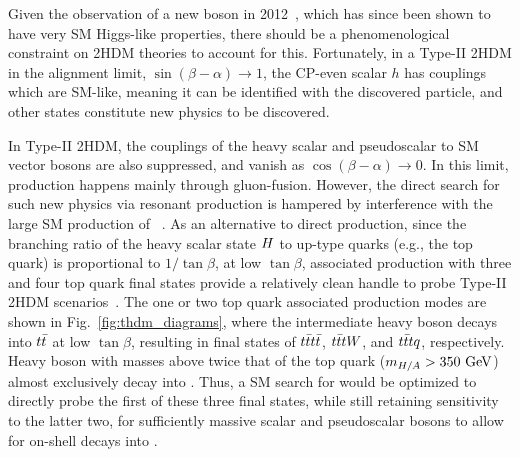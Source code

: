 Given the observation of a new boson in 2012~\cite{CMS:HiggsObservation,ATLAS:HiggsObservation},
which has since been shown to have very SM Higgs-like properties,
there should be a phenomenological constraint on 2HDM theories to
account for this. Fortunately, in a Type-II 2HDM in the alignment limit,
$\sin(\beta-\alpha)\rightarrow 1$,
the CP-even scalar $h$ has
couplings which are SM-like, meaning it can be identified with the discovered particle,
and other states constitute new physics to be discovered.

In Type-II 2HDM, the couplings of the heavy scalar and pseudoscalar to SM
vector bosons are also suppressed, and vanish as
$\cos(\beta-\alpha)\rightarrow 0$. In this limit, production happens mainly
through gluon-fusion. However, the direct search for such new physics via
resonant \ttbar production is hampered by interference with the large SM
production of \ttbar~\cite{THEORY:Gaemers1984sj,THEORY:Dicus1994bm}. As an
alternative to direct production, since the branching ratio of the heavy
scalar state $H$ to up-type quarks (e.g., the top quark) is proportional to
$1/\tan\beta$, at low $\tan\beta$, associated production with three and four
top quark final states provide a relatively clean handle to probe Type-II
2HDM scenarios~\cite{THEORY:Craig2015jba,THEORY:Craig2016ygr}. The one or two top quark
associated production modes are shown in Fig.~\ref{fig:thdm_diagrams}, where
the intermediate heavy boson decays into $t\bar{t}$ at low $\tan\beta$, resulting in
final states of $t\bar{t}t\bar{t}$, $t\bar{t}tW$, and $t\bar{t}tq$, respectively.
Heavy boson with masses above twice that of the top quark ($m_{H/A}>350~\text{GeV}$)
almost exclusively decay into \ttbar.
Thus, a SM search for \tttt would be optimized to directly probe the first of these three final states,
while still retaining sensitivity to the latter two, for sufficiently massive 
scalar and pseudoscalar bosons to allow for on-shell decays into \ttbar.

